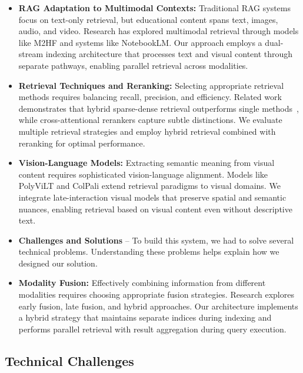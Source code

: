 \begin{itemize}
    \item \textbf{RAG Adaptation to Multimodal Contexts:} Traditional RAG systems focus on text-only retrieval, but educational content spans text, images, audio, and video. Research has explored multimodal retrieval through models like M2HF and systems like NotebookLM. Our approach employs a dual-stream indexing architecture that processes text and visual content through separate pathways, enabling parallel retrieval across modalities.
    
    \item \textbf{Retrieval Techniques and Reranking:} Selecting appropriate retrieval methods requires balancing recall, precision, and efficiency. Related work demonstrates that hybrid sparse-dense retrieval outperforms single methods~\cite{luan2021sparse_dense}, while cross-attentional rerankers capture subtle distinctions. We evaluate multiple retrieval strategies and employ hybrid retrieval combined with reranking for optimal performance.
    
    \item \textbf{Vision-Language Models:} Extracting semantic meaning from visual content requires sophisticated vision-language alignment. Models like PolyViLT and ColPali extend retrieval paradigms to visual domains. We integrate late-interaction visual models that preserve spatial and semantic nuances, enabling retrieval based on visual content even without descriptive text.
    
    \item \textbf{Challenges and Solutions} – To build this system, we had to solve several technical problems. Understanding these problems helps explain how we designed our solution.
    
    \item \textbf{Modality Fusion:} Effectively combining information from different modalities requires choosing appropriate fusion strategies. Research explores early fusion, late fusion, and hybrid approaches. Our architecture implements a hybrid strategy that maintains separate indices during indexing and performs parallel retrieval with result aggregation during query execution.
\end{itemize}

\subsection*{Technical Challenges}

